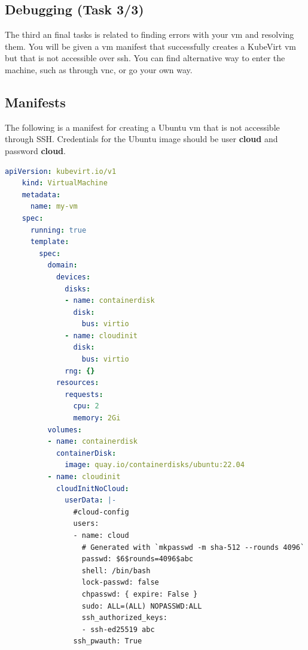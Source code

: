 \documentclass{kththesis}
\begin{document}
\begin{enumerate}
\section*{Debugging (Task 3/3)}
The third an final tasks is related to finding errors with your \Gls{vm} and resolving them. You will be given a \Gls{vm} manifest that successfully creates a KubeVirt \Gls{vm} but that is not accessible over \Gls{ssh}. You can find alternative way to enter the machine, such as through \Gls{vnc}, or go your own way. 

\subsection*{Manifests}
The following is a manifest for creating a Ubuntu \Gls{vm} that is not accessible through SSH. Credentials for the Ubuntu image should be user \textbf{cloud} and password \textbf{cloud}.
\begin{lstlisting}[language=yaml]
    apiVersion: kubevirt.io/v1
    kind: VirtualMachine
    metadata:
      name: my-vm
    spec:
      running: true
      template:
        spec:
          domain:
            devices:
              disks:
              - name: containerdisk
                disk:
                  bus: virtio
              - name: cloudinit
                disk:
                  bus: virtio
              rng: {}
            resources:
              requests:
                cpu: 2
                memory: 2Gi
          volumes:
          - name: containerdisk
            containerDisk:
              image: quay.io/containerdisks/ubuntu:22.04
          - name: cloudinit
            cloudInitNoCloud:
              userData: |-
                #cloud-config
                users:
                - name: cloud
                  # Generated with `mkpasswd -m sha-512 --rounds 4096`
                  passwd: $6$rounds=4096$abc
                  shell: /bin/bash
                  lock-passwd: false
                  chpasswd: { expire: False }
                  sudo: ALL=(ALL) NOPASSWD:ALL
                  ssh_authorized_keys:
                  - ssh-ed25519 abc
                ssh_pwauth: True
\end{lstlisting}


\end{enumerate}
\end{document}
